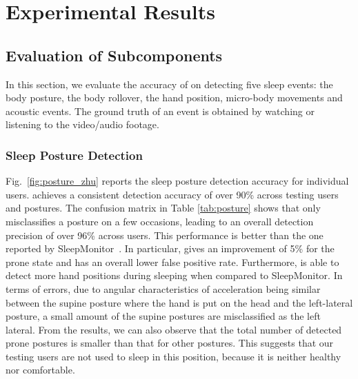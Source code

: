 \section{Experimental Results}\label{sec:4experiment}

\subsection{Evaluation of Subcomponents}
In this section, we evaluate the accuracy of \systemname on detecting five sleep events: the body posture, the body rollover, the hand
position, micro-body movements and acoustic events. The ground truth of an event is obtained by watching or listening to the video/audio
footage.



\subsubsection{Sleep Posture Detection}
\label{subsub:bodyposture} Fig.~\ref{fig:posture_zhu} reports the sleep posture detection accuracy for individual users. \systemname
achieves a consistent detection accuracy of over 90\% across testing users and postures. The confusion matrix in Table \ref{tab:posture}
shows that \systemname only misclassifies a posture on a few occasions, leading to an overall detection precision of over 96\% across
users. This performance is better than the one reported by SleepMonitor~\cite{sleepmonitor}. In particular, {\systemname} gives an
improvement of 5\% for the prone state and has an overall lower false positive rate. Furthermore, {\systemname} is able to detect more hand
positions during sleeping when compared to SleepMonitor. In terms of errors, due to angular characteristics of acceleration being similar
between the supine posture where the hand is put on the head and the left-lateral posture, a small amount of the supine postures are
misclassified as the left lateral. From the results, we can also observe that the total number of detected prone postures is smaller than
that for other postures. This suggests that our testing users are not used to sleep in this position, because it is neither healthy nor
comfortable.






